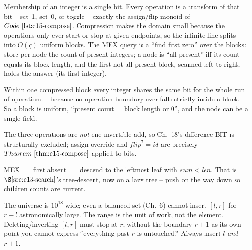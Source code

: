 Membership of an integer is a single bit.  Every operation is a transform of that bit -- set~1, set~0, or toggle -- exactly the assign/flip monoid of \(\coderef{c15-compose}\).  Compression makes the domain small because the operations only ever start or stop at given endpoints, so the infinite line splits into \(O(q)\) uniform blocks.  The MEX query is a ``find first zero'' over the blocks: store per node the count of present integers; a node is ``all present'' iff its count equals its block-length, and the first not-all-present block, scanned left-to-right, holds the answer (its first integer).

\begin{observation}
Within one compressed block every integer shares the same bit for the whole run of operations -- because no operation boundary ever falls strictly inside a block.  So a block is uniform, ``present count = block length or \(0\)'', and the node can be a single field.
\end{observation}
\begin{observation}
The three operations are \emph{not} one invertible add, so Ch.~18's difference BIT is structurally excluded; assign-override and \(\mathit{flip}^2=\mathit{id}\) are precisely \(\thmref{c15-compose}\) applied to bits.
\end{observation}
\begin{observation}
MEX \(=\) first absent \(=\) descend to the leftmost leaf with \(\mathit{sum}<\mathit{len}\).  That is \(\secref{c13-search}\)'s tree-descent, now on a lazy tree -- push on the way down so children counts are current.
\end{observation}

\begin{thinkbox}
{The universe is \(10^{18}\) wide; even a balanced set (Ch.~6) cannot insert \([l,r]\) for \(r-l\) astronomically large.  The range is the unit of work, not the element.}
{Deleting/inverting \([l,r]\) must stop at \(r\); without the boundary \(r+1\) as its own point you cannot express ``everything past \(r\) is untouched.''  Always insert \(l\) \emph{and} \(r+1\).}
\end{thinkbox}

